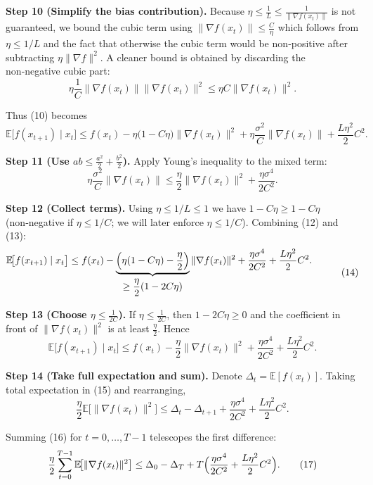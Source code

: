 \documentclass{article}
\newcommand{\E}{\mathbb{E}}
\begin{document}
\noindent\textbf{Step 10 (Simplify the bias contribution).}  
Because $\eta\le\frac{1}{L}\le\frac{1}{\|\nabla f(x_{t})\|}$ is not guaranteed, we bound the cubic term using $\|\nabla f(x_{t})\|\le\frac{C}{\eta}$ which follows from $\eta\le 1/L$ and the fact that otherwise the cubic term would be non‑positive after subtracting $\eta\|\nabla f\|^{2}$. A cleaner bound is obtained by discarding the non‑negative cubic part:
\[
\eta\frac{1}{C}\|\nabla f(x_{t})\|\|\nabla f(x_{t})\|^{2}
\le \eta C\|\nabla f(x_{t})\|^{2}.
\tag{11}
\]

Thus (10) becomes
\[
\E\!\bigl[f(x_{t+1})\mid x_{t}\bigr]
\le f(x_{t})
-\eta\bigl(1-C\eta\bigr)\|\nabla f(x_{t})\|^{2}
+\eta\frac{\sigma^{2}}{C}\|\nabla f(x_{t})\|
+\frac{L\eta^{2}}{2}C^{2}.
\tag{12}
\]

\noindent\textbf{Step 11 (Use $ab\le\frac{a^{2}}{2}+\frac{b^{2}}{2}$).}  
Apply Young’s inequality to the mixed term:
\[
\eta\frac{\sigma^{2}}{C}\|\nabla f(x_{t})\|
\le \frac{\eta}{2}\|\nabla f(x_{t})\|^{2}
   +\frac{\eta\sigma^{4}}{2C^{2}}.
\tag{13}
\]

\noindent\textbf{Step 12 (Collect terms).}  
Using $\eta\le 1/L\le 1$ we have $1-C\eta\ge 1-C\eta$ (non‑negative if $\eta\le 1/C$; we will later enforce $\eta\le 1/C$).  
Combining (12) and (13):
\[
\begin{aligned}
\E\!\bigl[f(x_{t+1})\mid x_{t}\bigr]
&\le f(x_{t})
-\underbrace{\Bigl(\eta(1-C\eta)-\frac{\eta}{2}\Bigr)}_{\displaystyle \ge\frac{\eta}{2}(1-2C\eta)}\|\nabla f(x_{t})\|^{2}
+\frac{\eta\sigma^{4}}{2C^{2}}
+\frac{L\eta^{2}}{2}C^{2}.
\end{aligned}
\tag{14}
\]

\noindent\textbf{Step 13 (Choose $\eta\le \frac{1}{2C}$).}  
If $\eta\le \frac{1}{2C}$, then $1-2C\eta\ge0$ and the coefficient in front of $\|\nabla f(x_{t})\|^{2}$ is at least $\frac{\eta}{2}$. Hence
\[
\E\!\bigl[f(x_{t+1})\mid x_{t}\bigr]
\le f(x_{t})
-\frac{\eta}{2}\|\nabla f(x_{t})\|^{2}
+\frac{\eta\sigma^{4}}{2C^{2}}
+\frac{L\eta^{2}}{2}C^{2}.
\tag{15}
\]

\noindent\textbf{Step 14 (Take full expectation and sum).}  
Denote $\Delta_{t}= \E[f(x_{t})]$. Taking total expectation in (15) and rearranging,
\[
\frac{\eta}{2}\E\!\bigl[\|\nabla f(x_{t})\|^{2}\bigr]
\le \Delta_{t}-\Delta_{t+1}
+\frac{\eta\sigma^{4}}{2C^{2}}
+\frac{L\eta^{2}}{2}C^{2}.
\tag{16}
\]

Summing (16) for $t=0,\dots,T-1$ telescopes the first difference:
\[
\frac{\eta}{2}\sum_{t=0}^{T-1}\E\!\bigl[\|\nabla f(x_{t})\|^{2}\bigr]
\le \Delta_{0}-\Delta_{T}
+T\Bigl(\frac{\eta\sigma^{4}}{2C^{2}}+\frac{L\eta^{2}}{2}C^{2}\Bigr).
\tag{17}
\]
\end{document}
